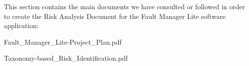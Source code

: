 
This section contains the main documents we have consulted or followed in order to create the Risk Analysis Document for the Fault Manager Lite software application:

\label{FMLProjectPlan}
Fault_Manager_Lite-Project_Plan.pdf

\label{TaxonomyRiskIdentification}
Taxonomy-based_Risk_Identification.pdf
